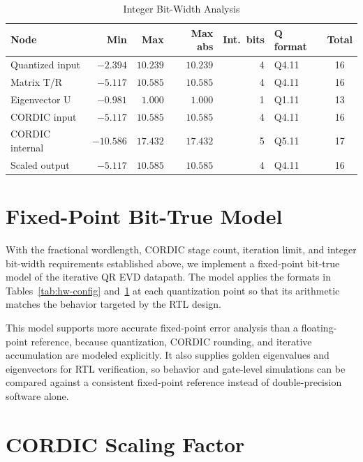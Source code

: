 \documentclass[12pt,a4paper]{report}
\begin{document}
\begin{table}[H]
\centering
\caption{Integer Bit-Width Analysis}
\label{tab:int-bits}
\vspace{0.15em}
\setlength{\tabcolsep}{10pt}
\renewcommand{\arraystretch}{1.25}
\begin{tabular}{lrrrrlc}
\toprule
\textbf{Node} & \textbf{Min} & \textbf{Max} & \textbf{Max abs} & \textbf{Int.\ bits} & \textbf{Q format} & \textbf{Total} \\
\midrule
Quantized input   & $-2.394$ & $10.239$ & $10.239$ & 4 & Q4.11 & 16 \\
Matrix T/R        & $-5.117$ & $10.585$ & $10.585$ & 4 & Q4.11 & 16 \\
Eigenvector U     & $-0.981$ & $1.000$  & $1.000$  & 1 & Q1.11 & 13 \\
CORDIC input      & $-5.117$ & $10.585$ & $10.585$ & 4 & Q4.11 & 16 \\
CORDIC internal   & $-10.586$ & $17.432$ & $17.432$ & 5 & Q5.11 & 17 \\
Scaled output     & $-5.117$ & $10.585$ & $10.585$ & 4 & Q4.11 & 16 \\
\bottomrule
\end{tabular}
\end{table}

\newpage

\section{Fixed-Point Bit-True Model}

With the fractional wordlength, CORDIC stage count, iteration limit, and integer bit-width requirements established above, we implement a fixed-point bit-true model of the iterative QR EVD datapath.
The model applies the formats in Tables~\ref{tab:hw-config} and~\ref{tab:int-bits} at each quantization point so that its arithmetic matches the behavior targeted by the RTL design.

This model supports more accurate fixed-point error analysis than a floating-point reference, because quantization, CORDIC rounding, and iterative accumulation are modeled explicitly.
It also supplies golden eigenvalues and eigenvectors for RTL verification, so behavior and gate-level simulations can be compared against a consistent fixed-point reference instead of double-precision software alone.

\section{CORDIC Scaling Factor}
\end{document}
